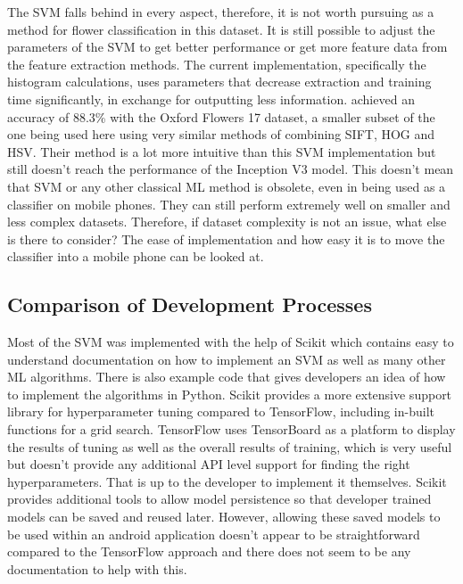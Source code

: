 \documentclass[12pt,a4paper]{report}
\begin{document}
\par

The SVM falls behind in every aspect, therefore, it is not worth pursuing as a method for flower classification in this 
dataset. It is still possible to adjust the parameters of the SVM to get better performance or get more feature data 
from the feature extraction methods. The current implementation, specifically the histogram calculations, uses parameters
that decrease extraction and training time significantly, in exchange for outputting less information. 
\citet{Nilsback2008}
achieved an accuracy of 88.3\% with the Oxford Flowers 17 dataset, a smaller subset of the one being used here using 
very similar methods of combining SIFT, HOG and HSV. Their method is a lot more intuitive than this SVM
implementation but still doesn't reach the performance of the Inception V3 model. This doesn't mean that SVM or any 
other classical ML method is obsolete, even in being used as a classifier on mobile phones. They can still
perform extremely well on smaller and less complex datasets. Therefore, if dataset complexity is not an issue, what 
else is there to consider? The ease of implementation and how easy it is to move the classifier 
into a mobile phone can be looked at.

\subsection{Comparison of Development Processes}
Most of the SVM was implemented with the help of Scikit which contains easy to understand documentation on how to 
implement an SVM as well as many other ML algorithms. There is also example code that gives developers an 
idea of how to implement the algorithms in Python. Scikit provides a more extensive support library for hyperparameter 
tuning compared to TensorFlow, including in-built functions for a grid search. TensorFlow uses TensorBoard as a platform 
to display the results of tuning as well as the overall results of training, which is very useful but doesn't provide 
any additional API level support for finding the right hyperparameters. That is up to the developer to implement it 
themselves. Scikit provides additional tools to allow model persistence so that developer trained models can be saved 
and reused later. However, allowing these saved models to be used within an android application doesn't appear to be 
straightforward compared to the TensorFlow approach and there does not seem to be any documentation to help with this. 
\end{document}
